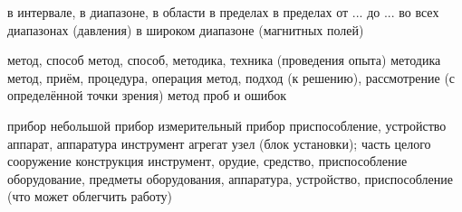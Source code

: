 	{в интервале, в диапазоне, в области}
	{в пределах}
	{в пределах от ... до ...}
	{во всех диапазонах (давления)}
	{в широком диапазоне (магнитных полей)}


	{метод, способ}
	{метод, способ, методика, техника (проведения опыта)}
	{методика}
	{метод, приём, процедура, операция}
	{метод, подход (к решению), рассмотрение (с определённой точки зрения)}
	{метод проб и ошибок}

	{прибор}
	{небольшой прибор}
	{измерительный прибор}
	{приспособление, устройство}
	{аппарат, аппаратура}
	{инструмент}
	{агрегат}
	{узел (блок установки); часть целого}
	{сооружение}
	{конструкция}
	{инструмент, орудие, средство, приспособление}
	{оборудование, предметы оборудования, аппаратура, устройство, приспособление 
		(что может облегчить работу)}

